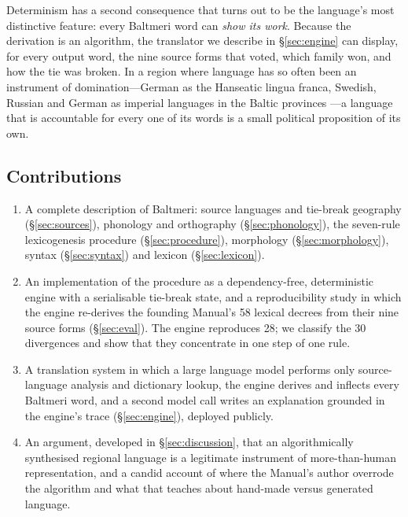 Determinism has a second consequence that turns out to be the language's most distinctive feature: every Baltmeri word can \emph{show its work}. Because the derivation is an algorithm, the translator we describe in \S\ref{sec:engine} can display, for every output word, the nine source forms that voted, which family won, and how the tie was broken. In a region where language has so often been an instrument of domination---German as the Hanseatic lingua franca, Swedish, Russian and German as imperial languages in the Baltic provinces \citep{serzant2025,north2015}---a language that is accountable for every one of its words is a small political proposition of its own.

\subsection{Contributions}
\begin{enumerate}
\item A complete description of Baltmeri: source languages and tie-break geography (\S\ref{sec:sources}), phonology and orthography (\S\ref{sec:phonology}), the seven-rule lexicogenesis procedure (\S\ref{sec:procedure}), morphology (\S\ref{sec:morphology}), syntax (\S\ref{sec:syntax}) and lexicon (\S\ref{sec:lexicon}).
\item An implementation of the procedure as a dependency-free, deterministic engine with a serialisable tie-break state, and a reproducibility study in which the engine re-derives the founding Manual's 58 lexical decrees from their nine source forms (\S\ref{sec:eval}). The engine reproduces 28; we classify the 30 divergences and show that they concentrate in one step of one rule.
\item A translation system in which a large language model performs only source-language analysis and dictionary lookup, the engine derives and inflects every Baltmeri word, and a second model call writes an explanation grounded in the engine's trace (\S\ref{sec:engine}), deployed publicly.
\item An argument, developed in \S\ref{sec:discussion}, that an algorithmically synthesised regional language is a legitimate instrument of more-than-human representation, and a candid account of where the Manual's author overrode the algorithm and what that teaches about hand-made versus generated language.
\end{enumerate}
